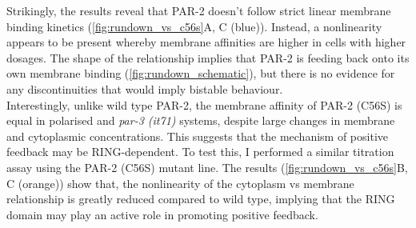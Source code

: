 \documentclass[12pt]{"report"}
\begin{document}
Strikingly, the results reveal that PAR-2 doesn't follow strict linear membrane binding kinetics (\cref{fig:rundown_vs_c56s}A, C (blue)). Instead, a nonlinearity appears to be present whereby membrane affinities are higher in cells with higher dosages. The shape of the relationship implies that PAR-2 is feeding back onto its own membrane binding (\cref{fig:rundown_schematic}), but there is no evidence for any discontinuities that would imply bistable behaviour.\\

Interestingly, unlike wild type PAR-2, the membrane affinity of PAR-2 (C56S) is equal in polarised and \textit{par-3 (it71)} systems, despite large changes in membrane and cytoplasmic concentrations. This suggests that the mechanism of positive feedback may be RING-dependent. To test this, I performed a similar titration assay using the PAR-2 (C56S) mutant line. The results (\cref{fig:rundown_vs_c56s}B, C (orange)) show that, the nonlinearity of the cytoplasm vs membrane relationship is greatly reduced compared to wild type, implying that the RING domain may play an active role in promoting positive feedback.\\
\end{document}
